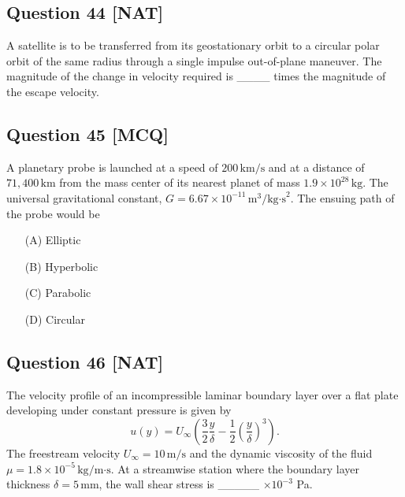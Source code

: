 \documentclass[12pt,a4paper]{article}
\begin{document}
\subsection*{Question 44 [NAT]}
A satellite is to be transferred from its geostationary orbit to a circular polar orbit of the same radius through a single impulse out-of-plane maneuver. The magnitude of the change in velocity required is \_\_\_\_ times the magnitude of the escape velocity.

\vspace{0.5cm}

\subsection*{Question 45 [MCQ]}
A planetary probe is launched at a speed of \( 200 \, \text{km/s} \) and at a distance of \( 71{,}400 \, \text{km} \) from the mass center of its nearest planet of mass \( 1.9 \times 10^{28} \, \text{kg} \). The universal gravitational constant, \( G = 6.67 \times 10^{-11} \, \text{m}^3/\text{kg·s}^2 \). The ensuing path of the probe would be

\begin{itemize}
\item[(A)] Elliptic  
\item[(B)] Hyperbolic  
\item[(C)] Parabolic  
\item[(D)] Circular  
\end{itemize}





\subsection*{Question 46 [NAT]}

The velocity profile of an incompressible laminar boundary layer over a flat plate developing under constant pressure is given by  
\[
u(y) = U_\infty \left( \frac{3}{2} \frac{y}{\delta} - \frac{1}{2} \left( \frac{y}{\delta} \right)^3 \right).
\]  
The freestream velocity \( U_\infty = 10 \, \text{m/s} \) and the dynamic viscosity of the fluid  
\( \mu = 1.8 \times 10^{-5} \, \text{kg}/\text{m·s} \). At a streamwise station where the boundary layer thickness \( \delta = 5 \, \text{mm} \), the wall shear stress is \_\_\_\_\_ \( \times 10^{-3} \) Pa.


\vspace{0.5cm}
\end{document}
